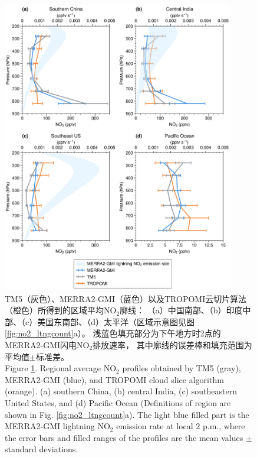 \begin{figure}[H]
    \centering
    \includegraphics[width=0.9\textwidth]{./figures/utno2_profile.png}
    \caption{
    TM5（灰色）、MERRA2-GMI（蓝色）以及TROPOMI云切片算法（橙色）所得到的区域平均NO$_2$廓线：
    （a）中国南部、（b）印度中部、（c）美国东南部、（d）太平洋（区域示意图见图\ref{fig:no2_ltngcount}a）。
    浅蓝色填充部分为下午地方时2点的MERRA2-GMI闪电NO$_2$排放速率，
    其中廓线的误差棒和填充范围为平均值$\pm$标准差。\\
    Figure \ref{fig:utno2_profile}. Regional average NO$_2$ profiles obtained by TM5 (gray), MERRA2-GMI (blue), and TROPOMI cloud slice algorithm (orange).
    (a) southern China, (b) central India, (c) southeastern United States, and (d) Pacific Ocean
    (Definitions of region are shown in Fig. \ref{fig:no2_ltngcount}a).
    The light blue filled part is the MERRA2-GMI lightning NO$_2$ emission rate at local 2 p.m.,
    where the error bars and filled ranges of the profiles are the mean values $\pm$ standard deviations.
    }
    \label{fig:utno2_profile}
\end{figure}


